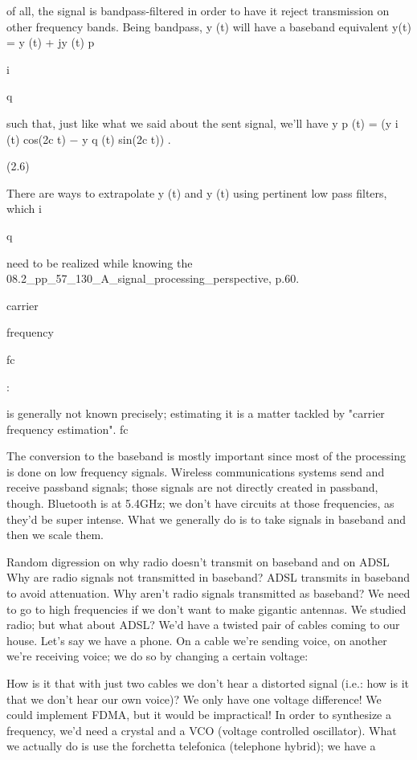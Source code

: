 {of all, the signal is bandpass-filtered in order to have it reject transmission on other frequency bands. Being bandpass, y (t) will have a baseband equivalent y(t) = y (t) + jy (t)
p

i

q

such that, just like what we said about the sent signal, we'll have y p (t) = (y i (t) cos(2\pif c t) − y q (t) sin(2\pif c t)) .

(2.6)

There are ways to extrapolate y (t) and y (t) using pertinent low pass filters, which i

q

need to be realized while knowing the 08.2_pp_57_130_A_signal_processing_perspective, p.60.

carrier

frequency

fc

:

is generally not known precisely; estimating it is a matter tackled by "carrier frequency estimation".
fc

The conversion to the baseband is mostly important since most of the processing is done on low frequency signals.
Wireless communications systems send and receive passband signals; those signals are not directly created in passband, though.
Bluetooth is at 5.4GHz; we don't have circuits at those frequencies, as they'd be super intense.
What we generally do is to take signals in baseband and then we scale them.

Random digression on why radio doesn't transmit on baseband and on ADSL Why are radio signals not transmitted in baseband?
ADSL transmits in baseband to avoid attenuation.
Why aren't radio signals transmitted as baseband? We need to go to high frequencies if we don't want to make gigantic antennas.
We studied radio; but what about ADSL? We'd have a twisted pair of cables coming to our house.
Let's say we have a phone. On a cable we're sending voice, on another we're receiving voice; we do so by changing a certain voltage:

How is it that with just two cables we don't hear a distorted signal (i.e.: how is it that we don't hear our own voice)? We only have one voltage difference!
We could implement FDMA, but it would be impractical! In order to synthesize a frequency, we'd need a crystal and a VCO (voltage controlled oscillator).
What we actually do is use the forchetta telefonica (telephone hybrid); we have a

}
